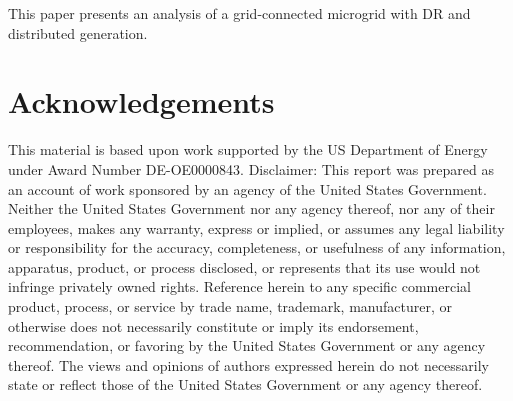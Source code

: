 
This paper presents an analysis of a grid-connected microgrid with DR and distributed generation. 

\section*{Acknowledgements}
This material is based upon work supported by the US Department of Energy
under Award Number DE-OE0000843. Disclaimer: This report was prepared
as an account of work sponsored by an agency of the United States
Government. Neither the United States Government nor any agency thereof,
nor any of their employees, makes any warranty, express or implied, or
assumes any legal liability or responsibility for the accuracy, completeness,
or usefulness of any information, apparatus, product, or process disclosed,
or represents that its use would not infringe privately owned rights.
Reference herein to any specific commercial product, process, or service
by trade name, trademark, manufacturer, or otherwise does not necessarily
constitute or imply its endorsement, recommendation, or favoring by the
United States Government or any agency thereof. The views and opinions
of authors expressed herein do not necessarily state or reflect those of the
United States Government or any agency thereof.


